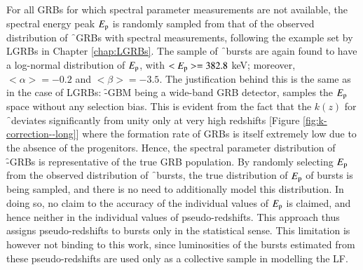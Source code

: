For all GRBs for which spectral parameter measurements are not available, the spectral energy peak $E_{\rm p}$ is randomly sampled from that of the observed distribution of \f\ GRBs with spectral measurements, following the example set by LGRBs in Chapter \ref{chap:LGRBs}. The sample of \f\ bursts are again found to have a log-normal distribution of $E_{\rm p}$, with $<E_{\rm p}> = 382.8$ keV; moreover, $<\alpha> = -0.2$ and $<\beta> = -3.5$. The justification behind this is the same as in the case of LGRBs: \f -GBM being a wide-band GRB detector, samples the $E_{\rm p}$ space without any selection bias. This is evident from the fact that the $k(z)$ for \f\ deviates significantly from unity only at very high redshifts [Figure \ref{fig:k-correction--long}] where the formation rate of GRBs is itself extremely low due to the absence of the progenitors. Hence, the spectral parameter distribution of \f -GRBs is representative of the true GRB population. By randomly selecting $E_{\rm p}$ from the observed distribution of \f\ bursts, the true distribution of $E_{\rm p}$ of bursts is being sampled, and there is no need to additionally model this distribution. In doing so, no claim to the accuracy of the individual values of $E_{\rm p}$ is claimed, and hence neither in the individual values of pseudo-redshifts. This approach thus assigns pseudo-redshifts to bursts only in the statistical sense. This limitation is however not binding to this work, since luminosities of the bursts estimated from these pseudo-redshifts are used only as a collective sample in modelling the LF.

